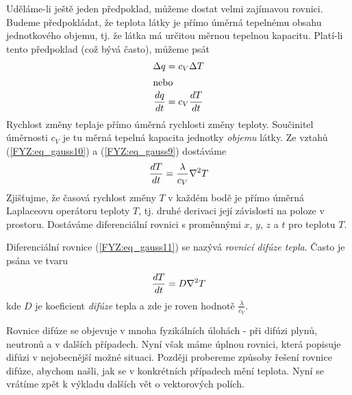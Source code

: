       Uděláme-li ještě jeden předpoklad, můžeme dostat velmi zajímavou rovnici. Budeme předpokládat, 
      že teplota látky je přímo úměrná tepelnému obsahu jednotkového objemu, tj. že látka má 
      určitou  měrnou tepelnou kapacitu. Platí-li tento předpoklad (což bývá často), můžeme psát
      \begin{align}
         \Delta q   &= c_V\Delta T                                        \nonumber    \\ 
       \intertext{nebo}
         \frac{d q}{d t} &= c_V\frac{d T}{d t}                                      \label{FYZ:eq_gauss10}
      \end{align}    
      Rychlost změny teplaje přímo úměrná rychlosti změny teploty. Součinitel úměrnosti \(c_V\) je 
      tu měrná tepelná kapacita jednotky \emph{objemu} látky. Ze vztahů (\ref{FYZ:eq_gauss10}) a 
      (\ref{FYZ:eq_gauss9}) 
      dostáváme
      \begin{equation}\label{FYZ:eq_gauss11}
       \frac{d T}{d t} = \frac{\lambda}{c_V}\nabla^2T
      \end{equation}
      Zjišťujme, že časová rychlost změny \(T\) v každém bodě je přímo úměrná Laplaceovu operátoru 
      teploty \(T\), tj. druhé derivaci její závislosti na poloze v prostoru. Dostáváme 
      diferenciální rovnici s proměnnými \(x\), \(y\), \(z\) a \(t\) pro teplotu \(T\).
      
      Diferenciální rovnice (\ref{FYZ:eq_gauss11}) se nazývá \emph{rovnicí difúze tepla}. Často je 
      psána ve tvaru
      \begin{equation}\label{FYZ:eq_gauss12}
       \frac{d T}{d t} = D\nabla^2T
      \end{equation}
      kde \(D\) je koeficient \emph{difúze} tepla a zde je roven hodnotě
      \(\displaystyle\frac{\lambda}{c_V}\).
      
      Rovnice difúze se objevuje v mnoha fyzikálních úlohách - při difúzi plynů, neutronů a v 
      dalších případech. Nyní však máme úplnou rovnici, která popisuje difúzi v nejobecnější možné 
      situaci. Později probereme způsoby řešení rovnice difúze, abychom našli, jak se v konkrétních 
      případech mění teplota. Nyní se vrátíme zpět k výkladu dalších vět o vektorových polích.

